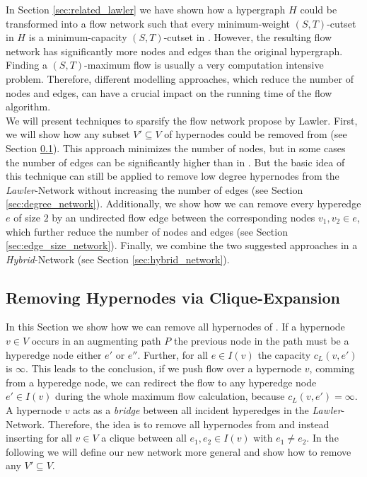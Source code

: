 
In Section \ref{sec:related_lawler} we have shown how a hypergraph $H$ could be transformed into 
a flow network  such that every minimum-weight $(S,T)$-cutset in $H$ is a
minimum-capacity $(S,T)$-cutset in  \cite{lawler1973}. However, the resulting flow
network has significantly more nodes and edges than the original hypergraph. Finding a
$(S,T)$-maximum flow is usually a very computation intensive problem. 
Therefore, different modelling approaches, which reduce the number of nodes and edges,
can have a crucial impact on the running time of the flow algorithm. \\
We will present techniques to sparsify the flow network 
propose by Lawler. First, we will show how any subset $V' \subseteq V$ of hypernodes could be removed 
from  (see Section \ref{sec:heuer_network}). This approach minimizes
the number of nodes, but in some cases the number of edges can be
significantly higher than in . But the basic idea of this technique 
can still be applied to remove low degree hypernodes from the \emph{Lawler}-Network without 
increasing the number of edges (see Section \ref{sec:degree_network}). Additionally, we show
how we can remove every hyperedge $e$ of size $2$ by an undirected flow edge between
the corresponding nodes $v_1,v_2 \in e$, which further reduce the
number of nodes and edges (see Section \ref{sec:edge_size_network}). Finally, we combine
the two suggested approaches in a \emph{Hybrid}-Network (see Section \ref{sec:hybrid_network}).



\subsection{Removing Hypernodes via Clique-Expansion}
\label{sec:heuer_network}

In this Section we show how we can remove all hypernodes of . If a hypernode $v \in V$
occurs in an augmenting path $P$ the previous node in the path must be a hyperedge node either
$e'$ or $e''$. Further, for all $e \in I(v)$ the capacity $c_L(v,e')$ is $\infty$. This leads to
the conclusion, if we push flow over a hypernode $v$, comming from a hyperedge node, we can redirect
the flow to any hyperedge node $e' \in I(v)$ during the whole maximum flow calculation, because 
$c_L(v,e') = \infty$. A hypernode $v$ acts as a \emph{bridge} between all incident hyperedges in the 
\emph{Lawler}-Network. Therefore, the idea is to remove all hypernodes from  and instead
inserting for all $v \in V$ a clique between all $e_1, e_2 \in I(v)$ with $e_1 \neq e_2$.
In the following we will define our new network more general and show how to remove
any $V' \subseteq V$.

